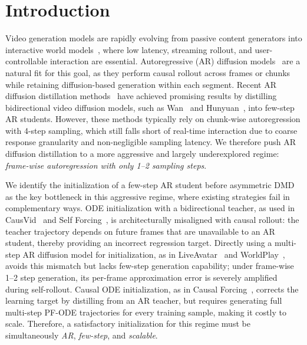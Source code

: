 \section{Introduction}
Video generation models are rapidly evolving from passive content generators into interactive world models~\cite{videoworldsimulators2024, bao2024vidu,wan2025wan,kong2024hunyuanvideo,yang2024cogvideox,lin2024open,zheng2024open,sun2025worldplay,genie3,huang2025live,ki2026avatar,sun2025streamavatar,feng2025vidarc,ye2026worldactionmodelszeroshot}, where low latency, streaming rollout, and user-controllable interaction are essential. Autoregressive (AR) diffusion models~\cite{jin2024pyramidal,teng2025magi,chen2025skyreels} are a natural fit for this goal, as they perform causal rollout across frames or chunks while retaining diffusion-based generation within each segment. Recent AR diffusion distillation methods~\cite{yin2025slow,huang2025self,zhu2026causal,huang2025live,sun2025worldplay} have achieved promising results by distilling bidirectional video diffusion models, such as Wan~\cite{wan2025wan} and Hunyuan~\cite{kong2024hunyuanvideo}, into few-step AR students. However, these methods typically rely on chunk-wise autoregression with 4-step sampling, which still falls short of real-time interaction due to coarse response granularity and non-negligible sampling latency.  We therefore push AR diffusion distillation to a more aggressive and largely underexplored regime: \emph{frame-wise autoregression with only 1--2 sampling steps}.

We identify the initialization of a few-step AR student before asymmetric DMD as the key bottleneck in this aggressive regime, where existing strategies fail in complementary ways. ODE initialization with a bidirectional teacher, as used in CausVid~\cite{yin2025slow} and Self Forcing~\cite{huang2025self}, is architecturally misaligned with causal rollout: the teacher trajectory depends on future frames that are unavailable to an AR student, thereby providing an incorrect regression target. Directly using a multi-step AR diffusion model for initialization, as in LiveAvatar~\cite{huang2025live} and WorldPlay~\cite{sun2025worldplay}, avoids this mismatch but lacks few-step generation capability; under frame-wise 1--2 step generation, its per-frame approximation error is severely amplified during self-rollout. Causal ODE initialization, as in Causal Forcing~\cite{zhu2026causal}, corrects the learning target by distilling from an AR teacher, but requires generating full multi-step PF-ODE trajectories for every training sample, making it costly to scale. Therefore, a satisfactory initialization for this regime must be simultaneously \emph{AR}, \emph{few-step}, and \emph{scalable}.

